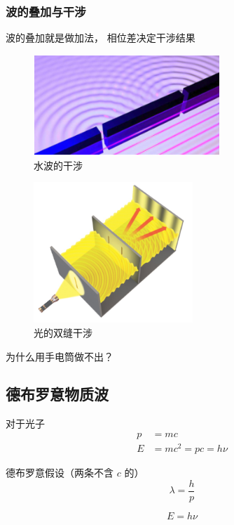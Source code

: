 \subsubsection{波的叠加与干涉}
波的叠加就是做加法， 相位差决定干涉结果

\begin{figure}[ht]
\centering
\includegraphics[width=7cm]{./figures/QMIntr4.png}
\caption{水波的干涉} \label{QMIntr_fig4}
\end{figure}

\begin{figure}[ht]
\centering
\includegraphics[width=6cm]{./figures/QMIntr5.png}
\caption{光的双缝干涉} \label{QMIntr_fig5}
\end{figure}

为什么用手电筒做不出？

\subsection{德布罗意物质波}

对于光子
\begin{equation}
\begin{aligned}
p &= mc
\\
E &= mc^2 = pc = h\nu
\end{aligned}
\end{equation}

德布罗意假设（两条不含 $c$ 的）
\begin{equation}
\lambda = \frac{h}{p}
\end{equation}

\begin{equation}
E = h\nu
\end{equation}

